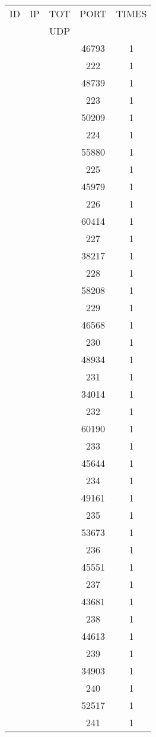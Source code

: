\documentclass[a4paper]{scrartcl}
\begin{document}
\begin{minipage}[b]{0.5\linewidth}
\begin{tabular}{| c | c | c | c | c |}
\hline
ID & IP & TOT & PORT & TIMES \\ 
   &    & UDP &      &       \\ 
\hline
& & & 46793 & 1 \\ & & & 222 & 1 \\ & & & 48739 & 1 \\ & & & 223 & 1 \\ & & & 50209 & 1 \\ & & & 224 & 1 \\ & & & 55880 & 1 \\ & & & 225 & 1 \\ & & & 45979 & 1 \\ & & & 226 & 1 \\ & & & 60414 & 1 \\ & & & 227 & 1 \\ & & & 38217 & 1 \\ & & & 228 & 1 \\ & & & 58208 & 1 \\ & & & 229 & 1 \\ & & & 46568 & 1 \\ & & & 230 & 1 \\ & & & 48934 & 1 \\ & & & 231 & 1 \\ & & & 34014 & 1 \\ & & & 232 & 1 \\ & & & 60190 & 1 \\ & & & 233 & 1 \\ & & & 45644 & 1 \\ & & & 234 & 1 \\ & & & 49161 & 1 \\ & & & 235 & 1 \\ & & & 53673 & 1 \\ & & & 236 & 1 \\ & & & 45551 & 1 \\ & & & 237 & 1 \\ & & & 43681 & 1 \\ & & & 238 & 1 \\ & & & 44613 & 1 \\ & & & 239 & 1 \\ & & & 34903 & 1 \\ & & & 240 & 1 \\ & & & 52517 & 1 \\ & & & 241 & 1 \\ \hline\end{tabular}\end{minipage} \hfill\begin{minipage}[b]{0.5\linewidth}\begin{tabular}{| c | c | c | c | c |}

\end{tabular}
\end{minipage}
\end{document}
